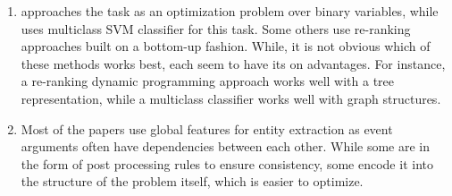 \begin{enumerate}
\item {} \citeauthor{riedelmc} approaches the task as an optimization problem over binary variables, while \citeauthor{bjorne} uses multiclass SVM classifier for this task. Some others use re-ranking approaches \cite{toutanova} built on a bottom-up fashion. While, it is not obvious which of these methods works best, each seem to have its on advantages. For instance, a re-ranking dynamic programming approach works well with a tree representation, while a multiclass classifier works well with graph structures.

\item {} Most of the papers use global features for entity extraction as event arguments often have dependencies between each other. While some are in the form of post processing rules to ensure consistency, some encode it into the structure of the problem itself, which is easier to optimize.

\end{enumerate}